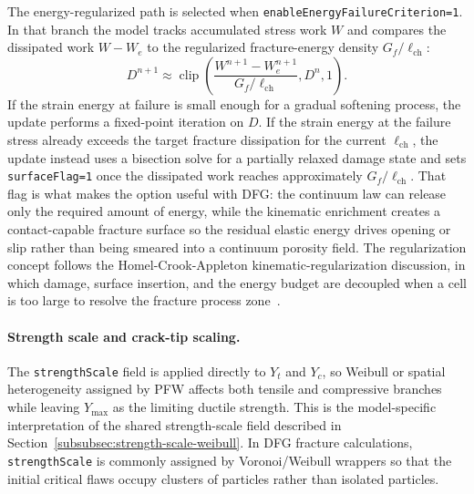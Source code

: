 The energy-regularized path is selected when \texttt{enableEnergyFailureCriterion=1}.  In that branch the model tracks accumulated stress work \(W\) and compares the dissipated work \(W-W_e\) to the regularized fracture-energy density \(G_f/\ell_{\mathrm{ch}}\):
\begin{equation}
  D^{n+1}\approx
  \operatorname{clip}\left(\frac{W^{n+1}-W_e^{n+1}}{G_f/\ell_{\mathrm{ch}}},D^n,1\right).
  \label{eq:ceramic-energy-damage}
\end{equation}
If the strain energy at failure is small enough for a gradual softening process, the update performs a fixed-point iteration on \(D\).  If the strain energy at the failure stress already exceeds the target fracture dissipation for the current \(\ell_{\mathrm{ch}}\), the update instead uses a bisection solve for a partially relaxed damage state and sets \texttt{surfaceFlag=1} once the dissipated work reaches approximately \(G_f/\ell_{\mathrm{ch}}\).  That flag is what makes the option useful with DFG: the continuum law can release only the required amount of energy, while the kinematic enrichment creates a contact-capable fracture surface so the residual elastic energy drives opening or slip rather than being smeared into a continuum porosity field.  The regularization concept follows the Homel-Crook-Appleton kinematic-regularization discussion, in which damage, surface insertion, and the energy budget are decoupled when a cell is too large to resolve the fracture process zone~\cite{homelCrookAppleton2026sizeeffects}.

\paragraph{Strength scale and crack-tip scaling.}
The \texttt{strengthScale} field is applied directly to \(Y_t\) and \(Y_c\), so Weibull or spatial heterogeneity assigned by PFW affects both tensile and compressive branches while leaving \(Y_{\max}\) as the limiting ductile strength.  This is the model-specific interpretation of the shared strength-scale field described in Section~\ref{subsubsec:strength-scale-weibull}.  In DFG fracture calculations, \texttt{strengthScale} is commonly assigned by Voronoi/Weibull wrappers so that the initial critical flaws occupy clusters of particles rather than isolated particles.

